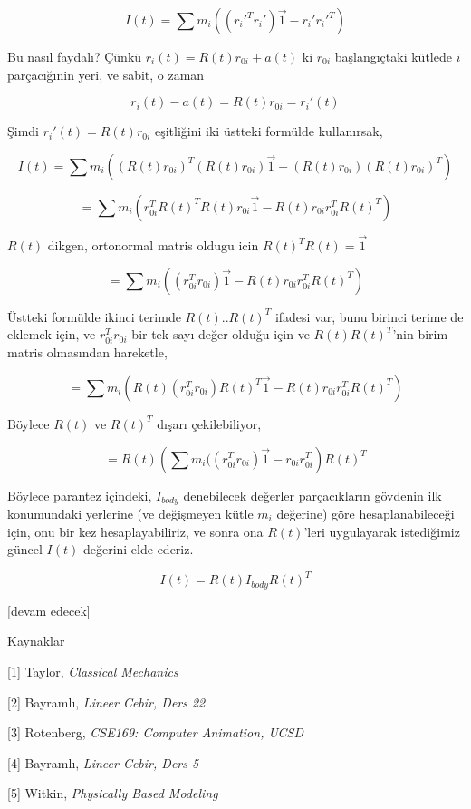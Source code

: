 \documentclass[12pt,fleqn]{article}\usepackage{../../common}
\begin{document}
$$
I(t) = \sum m_i ((r_i'^T r_i') \vec{1} - r_i' r_i'^T)
$$

Bu nasıl faydalı? Çünkü $r_i(t) = R(t) r_{0i} + a(t)$ ki $r_{0i}$ başlangıçtaki
kütlede $i$ parçacığınin yeri, ve sabit, o zaman

$$
r_i(t) - a(t) = R(t) r_{0i} = r_i'(t)
$$

Şimdi $r_i'(t) = R(t) r_{0i}$ eşitliğini iki üstteki formülde kullanırsak,

$$
I(t) = \sum
m_i ( (R(t) r_{0i})^T  (R(t) r_{0i})  \vec{1} -  (R(t) r_{0i})  (R(t) r_{0i})^T  )
$$

$$
= \sum
m_i ( r_{0i}^T R(t)^T R(t) r_{0i} \vec{1} -  R(t) r_{0i} r_{0i}^T R(t)^T )
$$

$R(t)$ dikgen, ortonormal matris oldugu icin $R(t)^TR(t) = \vec{1}$

$$
= \sum
m_i ( (r_{0i}^T r_{0i}) \vec{1} -  R(t) r_{0i} r_{0i}^T R(t)^T )
$$


Üstteki formülde ikinci terimde $R(t) .. R(t)^T$ ifadesi var, bunu
birinci terime de eklemek için, ve $r_{0i}^T r_{0i}$ bir tek sayı değer
olduğu için ve $R(t) R(t)^T$'nin birim matris olmasından hareketle,

$$
= \sum
m_i ( R(t) (r_{0i}^T r_{0i}) R(t)^T \vec{1} -  R(t) r_{0i} r_{0i}^T R(t)^T )
$$

Böylece $R(t)$ ve $R(t)^T$ dışarı çekilebiliyor,

$$
= R(t) \left( \sum 
m_i (( r_{0i}^T r_{0i}) \vec{1} -  r_{0i} r_{0i}^T
\right)  R(t)^T 
$$

Böylece parantez içindeki, $I_{body}$ denebilecek değerler parçacıkların
gövdenin ilk konumundaki yerlerine (ve değişmeyen kütle $m_i$ değerine) göre
hesaplanabileceği için, onu bir kez hesaplayabiliriz, ve sonra ona $R(t)$'leri
uygulayarak istediğimiz güncel $I(t)$ değerini elde ederiz.

$$
I(t) = R(t) I_{body} R(t)^T
$$





[devam edecek]

Kaynaklar

[1] Taylor, {\em Classical Mechanics}

[2] Bayramlı, {\em Lineer Cebir, Ders 22}

[3] Rotenberg, {\em CSE169: Computer Animation, UCSD}

[4] Bayramlı, {\em Lineer Cebir, Ders 5}

[5] Witkin, {\em Physically Based Modeling}
\end{document}
